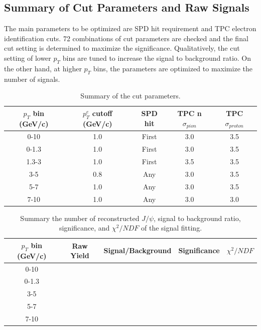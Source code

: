 \subsection{Summary of Cut Parameters and Raw Signals}
The main parameters to be optimized are SPD hit requirement and TPC electron identification cuts. 
72 combinations of cut parameters are checked and the final cut setting is determined to maximize the significance. 
Qualitatively, the cut setting of lower $p_{T}$ bins are tuned to increase the signal to background ratio. 
On the other hand, at higher $p_{T}$ bins, the parameters are optimized to maximize the number of signals. 
\begin{table}[!h]
  \centering
    \begin{tabular}{ccccc} \hline
      $p_{T}$ bin (GeV/c)  & $p^{e}_{T}$ cutoff (GeV/c) & SPD hit & TPC n$\sigma_{pion}$ & TPC $\sigma_{proton}$\\ \hline
      0-10          & 1.0   & First     &     3.0                          & 3.5                                      \\ 
      0-1.3         & 1.0  & First   &     3.0                           & 3.5                                      \\ 
      1.3-3         & 1.0  & First   &     3.5                          & 3.5                                      \\ 
      3-5           & 0.8  & Any     &     3.0                           & 3.5                                      \\ 
      5-7           & 1.0  & Any     &     3.0                           & 3.5                                      \\ 
      7-10          & 1.0  & Any     &     3.0                           & 3.0                                      \\  \hline
    \end{tabular}
\caption{Summary of the cut parameters.}
\end{table}
  \begin{table}[!h]
  \centering
  \begin{tabular}{ccccc} \hline
    $p_{T}$ bin (GeV/c) & Raw Yield & Signal/Background & Significance & $\chi^{2}/NDF$ \\ \hline
     0-10               &           &                    &              & \\
      0-1.3             &           &                    &              & \\
      3-5         &&&& \\
      5-7          &&&& \\
      7-10          &&&& \\  \hline
 \end{tabular}
  \caption{Summary the number of reconstructed $J/\psi$, signal to background ratio, significance, and $\chi^2/NDF$ of the signal fitting.}
\end{table}

